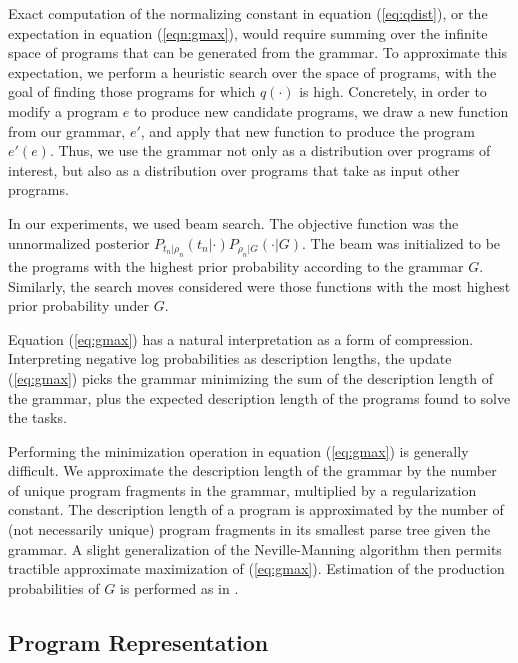 \documentclass{article} %
\begin{document}
Exact computation of the normalizing constant in equation (\ref{eq:qdist}), or the expectation in equation (\ref{eqn:gmax}), would require summing over the infinite space of programs that can be generated from the grammar. To approximate this expectation, we perform a heuristic search over the space of programs, with the goal of finding those programs for which $q(\cdot)$ is high.
Concretely, in order to modify a program $e$ to produce new candidate programs, we draw a new function from our grammar, $e'$, and apply that new function to produce the program $e'(e)$.
Thus, we use the grammar not only as a distribution over programs of interest, but also as a distribution over programs that take as input other programs.

In our experiments, we used beam search. The objective function was the unnormalized posterior $P_{t_n|\rho_n}(t_n | \cdot )P_{\rho_n | G}(\cdot | G)$.
The beam was initialized to be the programs with the highest prior probability according to the grammar $G$.
Similarly, the search moves considered were those functions with the most highest prior probability under $G$.

Equation (\ref{eq:gmax}) has a natural interpretation as a form of compression.
Interpreting negative log probabilities as description lengths, the update (\ref{eq:gmax}) picks the grammar minimizing the sum of the description length of the grammar, plus the expected description length of the programs found to solve the tasks.

Performing the minimization operation in equation (\ref{eq:gmax}) is generally difficult.
We approximate the description length of the grammar by the number of unique program fragments in the grammar, multiplied by a regularization constant.
The description length of a program is approximated by the number of (not necessarily unique) program fragments in its smallest parse tree given the grammar.
A slight generalization of the Neville-Manning algorithm then permits tractible approximate maximization of (\ref{eq:gmax}).
Estimation of the production probabilities of $G$ is performed as in \cite{ijcai}.

\subsection{Program Representation}
\end{document}
